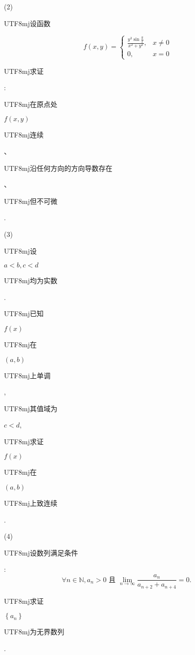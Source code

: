 \documentclass[10pt]{article}
\begin{document}
(2) \begin{CJK}{UTF8}{mj}设函数\end{CJK}
$$
f(x, y)= \begin{cases}\frac{y^{3} \sin \frac{y}{x}}{x^{2}+y^{2}}, & x \neq 0 \\ 0, & x=0\end{cases}
$$
\begin{CJK}{UTF8}{mj}求证\end{CJK}: \begin{CJK}{UTF8}{mj}在原点处\end{CJK} $f(x, y)$ \begin{CJK}{UTF8}{mj}连续\end{CJK}、\begin{CJK}{UTF8}{mj}沿任何方向的方向导数存在\end{CJK}、\begin{CJK}{UTF8}{mj}但不可微\end{CJK}.

(3) \begin{CJK}{UTF8}{mj}设\end{CJK} $a<b, c<d$ \begin{CJK}{UTF8}{mj}均为实数\end{CJK}. \begin{CJK}{UTF8}{mj}已知\end{CJK} $f(x)$ \begin{CJK}{UTF8}{mj}在\end{CJK} $(a, b)$ \begin{CJK}{UTF8}{mj}上单调\end{CJK}, \begin{CJK}{UTF8}{mj}其值域为\end{CJK} $c<d$, \begin{CJK}{UTF8}{mj}求证\end{CJK} $f(x)$ \begin{CJK}{UTF8}{mj}在\end{CJK} $(a, b)$ \begin{CJK}{UTF8}{mj}上致连续\end{CJK}.

(4) \begin{CJK}{UTF8}{mj}设数列满足条件\end{CJK}:
$$
\forall n \in \mathbb{N}, a_{n}>0 \text { 且 } \lim _{n \rightarrow \infty} \frac{a_{n}}{a_{n+2}+a_{n+4}}=0 \text {. }
$$
\begin{CJK}{UTF8}{mj}求证\end{CJK} $\left\{a_{n}\right\}$ \begin{CJK}{UTF8}{mj}为无界数列\end{CJK}.
\end{document}
